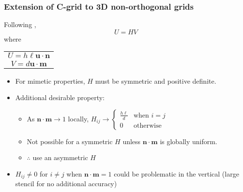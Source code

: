 \begin{frame}
\frametitle{Extension of C-grid to 3D non-orthogonal grids}

\begin{minipage}[c]{0.6\columnwidth}%
Following \cite*{TC12}, \cite*{TCD1x}
\[
U=HV
\]
where
\begin{tabular}{c}
$U=h\ell\mathbf{u}\cdot\mathbf{n}$\tabularnewline
$V=d\mathbf{u}\cdot\mathbf{m}$\tabularnewline
\end{tabular}%
\end{minipage}\textbf{\hfill{}}%
\begin{minipage}[c]{0.38\columnwidth}%
%
\end{minipage}
\pause
\begin{itemize}[<+->]
\item For mimetic properties, $H$ must be symmetric and positive definite. 
\item Additional desirable property:
\begin{itemize}
\item As $\mathbf{n}\cdot\mathbf{m}\rightarrow1$ locally, $H_{ij}\rightarrow\begin{cases}
\frac{h\ell}{d} & \text{when }i=j\\
0 & \text{otherwise }
\end{cases}$
\item Not possible for a symmetric $H$ unless $\mathbf{n}\cdot\mathbf{m}$
is globally uniform.
\item $\therefore$ use an asymmetric $H$
\end{itemize}
\item $H_{ij}\ne0$ for $i\ne j$ when $\mathbf{n}\cdot\mathbf{m}=1$ could
be problematic in the vertical (large stencil for no additional accuracy)
\end{itemize}
\end{frame}

